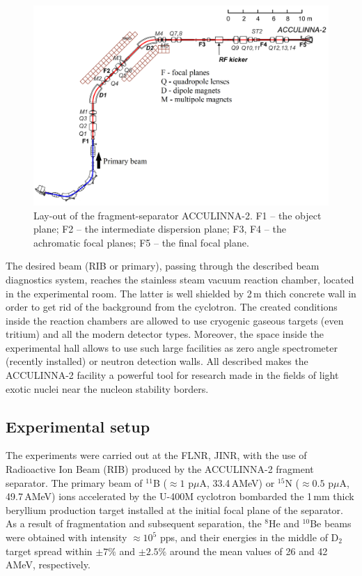 \begin{figure}[t]
	\begin{center}
		\includegraphics[width=1\textwidth]{figures/acculinna2.png}
	\end{center}
	\caption{Lay-out of the fragment-separator ACCULINNA-2. F1 – the object plane; F2 – the intermediate dispersion plane; F3, F4 – the achromatic focal planes; F5 – the final focal plane.}
	\label{fig:acculinna2_scheme}
\end{figure}

The desired beam (RIB or primary), passing through the described beam diagnostics system, reaches the stainless steam vacuum reaction chamber, located in the experimental room.
The latter is well shielded by 2\,m thich concrete wall in order to get rid of the background from the cyclotron.
The created conditions inside the reaction chambers are allowed to use cryogenic gaseous targets (even tritium) and all the modern detector types.
Moreover, the space inside the experimental hall allows to use such large facilities as zero angle spectrometer (recently installed) or neutron detection walls.
All described makes the ACCULINNA-2 facility a powerful tool for research made in the fields of light exotic nuclei near the nucleon stability borders.

\subsection{Experimental setup}

The experiments were carried out at the FLNR, JINR, with the use of Radioactive Ion Beam (RIB) produced by the ACCULINNA-2 fragment separator.
The primary beam of $^{11}$B ($\approx 1$ p$\mu$A, 33.4\,AMeV) or $^{15}$N ($\approx 0.5$ p$\mu$A, 49.7\,AMeV) ions accelerated by the U-400M cyclotron bombarded the 1\,mm thick beryllium production target installed at the initial focal plane of the separator.
As a result of fragmentation and subsequent separation, the $^8$He and $^{10}$Be beams were obtained with intensity $\approx 10^5$ pps, and their energies in the middle of D$_2$ target spread within $\pm 7 \%$ and $\pm 2.5 \%$ around the mean values of 26 and 42\,AMeV, respectively.

